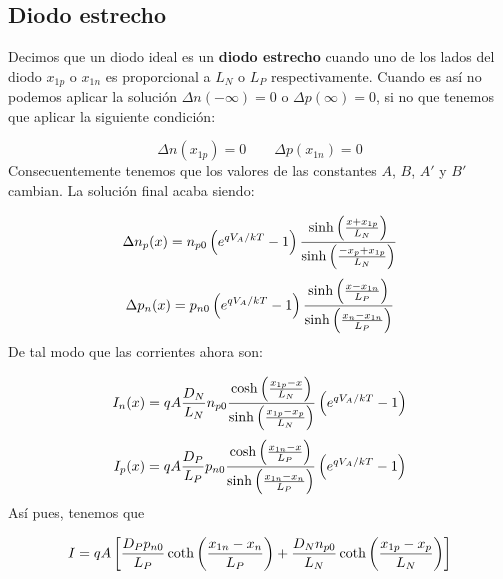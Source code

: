 \subsection{Diodo estrecho}

Decimos que un diodo ideal es un \textbf{diodo estrecho} cuando uno de los lados del diodo $x_{1p}$ o $x_{1n}$ es proporcional a $L_N$ o $L_P$  respectivamente. Cuando es así no podemos aplicar la solución $\Delta n (-\infty) = 0$ o $\Delta p (\infty) = 0$, si no que tenemos que aplicar la siguiente condición:

\begin{equation}
    \Delta n  (x_{1p}) = 0 \qquad \Delta p (x_{1n}) = 0
\end{equation}
Consecuentemente tenemos que los valores de las constantes $A$, $B$, $A'$ y $B'$ cambian. La solución final acaba siendo:

\begin{equation}
    \Delta n_p (x) = n_{p0} \left( e^{qV_A/kT}-1 \right) \frac{\sinh \left( \frac{x+x_{1p}}{L_N} \right)}{\sinh \left( \frac{-x_{p}+x_{1p}}{L_N} \right)}
\end{equation}
\begin{equation}
    \Delta p_n (x) = p_{n0} \left( e^{qV_A/kT}-1 \right) \frac{\sinh \left( \frac{x-x_{1n}}{L_P} \right)}{\sinh \left( \frac{x_{n}-x_{1n}}{L_P} \right)}
\end{equation}
De tal modo que las corrientes ahora son:

\begin{equation}
    I_n (x) = qA \frac{D_N}{L_N} n_{p0} \frac{\cosh \left( \frac{x_{1p}-x}{L_N} \right)}{\sinh \left( \frac{x_{1p}-x_p}{L_N} \right)} \left( e^{qV_A/kT}-1 \right)
\end{equation}
\begin{equation}
    I_p (x) = qA \frac{D_P}{L_P} p_{n0}  \frac{\cosh\left( \frac{x_{1n}-x}{L_P} \right)}{\sinh \left( \frac{x_{1n}-x_n}{L_P} \right)}  \left( e^{qV_A/kT}-1 \right)
\end{equation}
Así pues, tenemos que 

\begin{equation}
    I = qA\left[ \frac{D_Pp_{n0}}{L_P} \coth \left( \frac{x_{1n}-x_n}{L_P} \right)+\frac{D_N n_{p0}}{L_N} \coth \left( \frac{x_{1p}-x_p}{L_N} \right) \right]
\end{equation}



